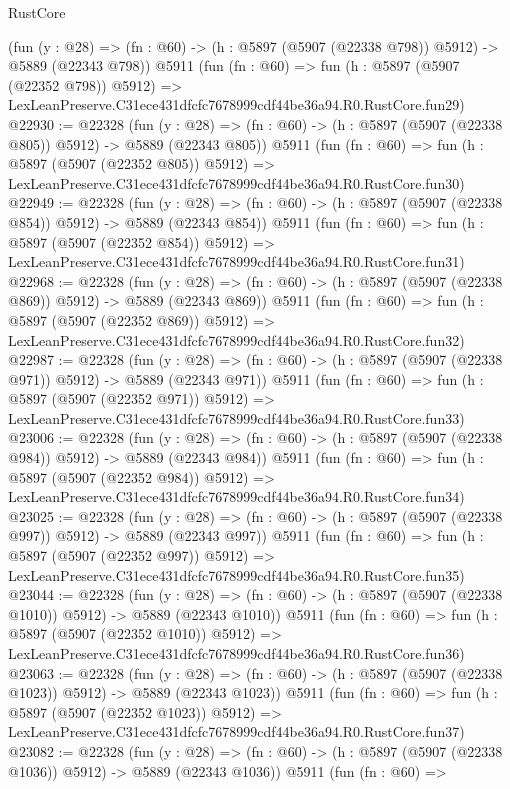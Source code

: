 \begin{lexlean}{RustCore}
\begin{coremodule}
    (fun (y : @28) => (fn : @60) -> (h : @5897 (@5907 (@22338 @798)) @5912) -> @5889 (@22343 @798))
    @5911
    (fun (fn : @60) =>
    fun (h : @5897 (@5907 (@22352 @798)) @5912) =>
    LexLeanPreserve.C31ece431dfcfc7678999cdf44be36a94.R0.RustCore.fun29)
@22930 := @22328
    (fun (y : @28) => (fn : @60) -> (h : @5897 (@5907 (@22338 @805)) @5912) -> @5889 (@22343 @805))
    @5911
    (fun (fn : @60) =>
    fun (h : @5897 (@5907 (@22352 @805)) @5912) =>
    LexLeanPreserve.C31ece431dfcfc7678999cdf44be36a94.R0.RustCore.fun30)
@22949 := @22328
    (fun (y : @28) => (fn : @60) -> (h : @5897 (@5907 (@22338 @854)) @5912) -> @5889 (@22343 @854))
    @5911
    (fun (fn : @60) =>
    fun (h : @5897 (@5907 (@22352 @854)) @5912) =>
    LexLeanPreserve.C31ece431dfcfc7678999cdf44be36a94.R0.RustCore.fun31)
@22968 := @22328
    (fun (y : @28) => (fn : @60) -> (h : @5897 (@5907 (@22338 @869)) @5912) -> @5889 (@22343 @869))
    @5911
    (fun (fn : @60) =>
    fun (h : @5897 (@5907 (@22352 @869)) @5912) =>
    LexLeanPreserve.C31ece431dfcfc7678999cdf44be36a94.R0.RustCore.fun32)
@22987 := @22328
    (fun (y : @28) => (fn : @60) -> (h : @5897 (@5907 (@22338 @971)) @5912) -> @5889 (@22343 @971))
    @5911
    (fun (fn : @60) =>
    fun (h : @5897 (@5907 (@22352 @971)) @5912) =>
    LexLeanPreserve.C31ece431dfcfc7678999cdf44be36a94.R0.RustCore.fun33)
@23006 := @22328
    (fun (y : @28) => (fn : @60) -> (h : @5897 (@5907 (@22338 @984)) @5912) -> @5889 (@22343 @984))
    @5911
    (fun (fn : @60) =>
    fun (h : @5897 (@5907 (@22352 @984)) @5912) =>
    LexLeanPreserve.C31ece431dfcfc7678999cdf44be36a94.R0.RustCore.fun34)
@23025 := @22328
    (fun (y : @28) => (fn : @60) -> (h : @5897 (@5907 (@22338 @997)) @5912) -> @5889 (@22343 @997))
    @5911
    (fun (fn : @60) =>
    fun (h : @5897 (@5907 (@22352 @997)) @5912) =>
    LexLeanPreserve.C31ece431dfcfc7678999cdf44be36a94.R0.RustCore.fun35)
@23044 := @22328
    (fun (y : @28) =>
    (fn : @60) -> (h : @5897 (@5907 (@22338 @1010)) @5912) -> @5889 (@22343 @1010))
    @5911
    (fun (fn : @60) =>
    fun (h : @5897 (@5907 (@22352 @1010)) @5912) =>
    LexLeanPreserve.C31ece431dfcfc7678999cdf44be36a94.R0.RustCore.fun36)
@23063 := @22328
    (fun (y : @28) =>
    (fn : @60) -> (h : @5897 (@5907 (@22338 @1023)) @5912) -> @5889 (@22343 @1023))
    @5911
    (fun (fn : @60) =>
    fun (h : @5897 (@5907 (@22352 @1023)) @5912) =>
    LexLeanPreserve.C31ece431dfcfc7678999cdf44be36a94.R0.RustCore.fun37)
@23082 := @22328
    (fun (y : @28) =>
    (fn : @60) -> (h : @5897 (@5907 (@22338 @1036)) @5912) -> @5889 (@22343 @1036))
    @5911
    (fun (fn : @60) =>

\end{coremodule}
\end{lexlean}
